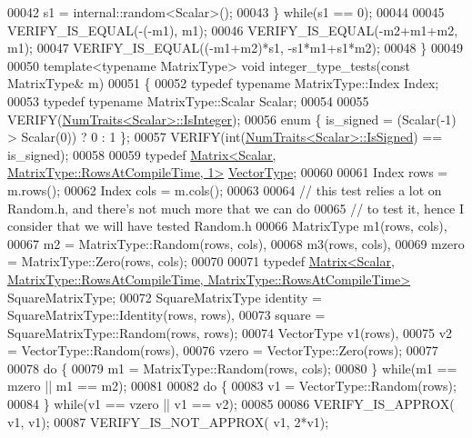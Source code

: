 \begin{DoxyCode}
00042     s1 = internal::random<Scalar>();
00043   \} \textcolor{keywordflow}{while}(s1 == 0);
00044 
00045   VERIFY\_IS\_EQUAL(-(-m1),                  m1);
00046   VERIFY\_IS\_EQUAL(-m2+m1+m2,               m1);
00047   VERIFY\_IS\_EQUAL((-m1+m2)*s1,             -s1*m1+s1*m2);
00048 \}
00049 
00050 \textcolor{keyword}{template}<\textcolor{keyword}{typename} MatrixType> \textcolor{keywordtype}{void} integer\_type\_tests(\textcolor{keyword}{const} MatrixType& m)
00051 \{
00052   \textcolor{keyword}{typedef} \textcolor{keyword}{typename} MatrixType::Index Index;
00053   \textcolor{keyword}{typedef} \textcolor{keyword}{typename} MatrixType::Scalar Scalar;
00054 
00055   VERIFY(\hyperlink{group___core___module_struct_eigen_1_1_num_traits}{NumTraits<Scalar>::IsInteger});
00056   \textcolor{keyword}{enum} \{ is\_signed = (Scalar(-1) > Scalar(0)) ? 0 : 1 \};
00057   VERIFY(\textcolor{keywordtype}{int}(\hyperlink{group___core___module_struct_eigen_1_1_num_traits}{NumTraits<Scalar>::IsSigned}) == is\_signed);
00058 
00059   \textcolor{keyword}{typedef} \hyperlink{group___core___module_class_eigen_1_1_matrix}{Matrix<Scalar, MatrixType::RowsAtCompileTime, 1>} 
      \hyperlink{struct_vector_type}{VectorType};
00060 
00061   Index rows = m.rows();
00062   Index cols = m.cols();
00063 
00064   \textcolor{comment}{// this test relies a lot on Random.h, and there's not much more that we can do}
00065   \textcolor{comment}{// to test it, hence I consider that we will have tested Random.h}
00066   MatrixType m1(rows, cols),
00067              m2 = MatrixType::Random(rows, cols),
00068              m3(rows, cols),
00069              mzero = MatrixType::Zero(rows, cols);
00070 
00071   \textcolor{keyword}{typedef} 
      \hyperlink{group___core___module_class_eigen_1_1_matrix}{Matrix<Scalar, MatrixType::RowsAtCompileTime, MatrixType::RowsAtCompileTime>}
       SquareMatrixType;
00072   SquareMatrixType identity = SquareMatrixType::Identity(rows, rows),
00073                    square = SquareMatrixType::Random(rows, rows);
00074   VectorType v1(rows),
00075              v2 = VectorType::Random(rows),
00076              vzero = VectorType::Zero(rows);
00077 
00078   \textcolor{keywordflow}{do} \{
00079     m1 = MatrixType::Random(rows, cols);
00080   \} \textcolor{keywordflow}{while}(m1 == mzero || m1 == m2);
00081 
00082   \textcolor{keywordflow}{do} \{
00083     v1 = VectorType::Random(rows);
00084   \} \textcolor{keywordflow}{while}(v1 == vzero || v1 == v2);
00085 
00086   VERIFY\_IS\_APPROX(               v1,    v1);
00087   VERIFY\_IS\_NOT\_APPROX(           v1,    2*v1);

\end{DoxyCode}
